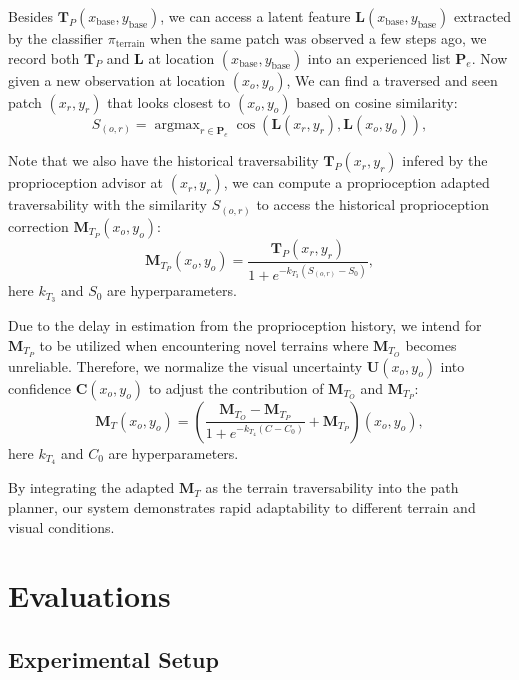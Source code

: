\documentclass[conference]{IEEEtran}
\DeclareMathOperator*{\argmax}{argmax}
\begin{document}
Besides $\bm{T}_P(x_\textrm{base},y_\textrm{base})$, we can access a latent feature $\bm{L}(x_\textrm{base}, y_\textrm{base})$ extracted by the classifier ${\pi_{\textrm{terrain}}}$ when the same patch was observed a few steps ago, we record both $\bm{T}_P$ and $\bm{L}$ at location $(x_\textrm{base},y_\textrm{base})$ into an experienced list $\bm{P}_e$. Now given a new observation at location $(x_o,y_o)$, We can find a traversed and seen patch $(x_r,y_r)$ that looks closest to $(x_o, y_o)$ based on cosine similarity:
\begin{equation}
       S_{(o,r)}=\argmax_{r \in \bm{P}_e}\cos{(\bm{L}(x_r, y_r),\bm{L}(x_o, y_o))},
\end{equation}

Note that we also have the historical traversability $\bm{T}_P(x_r,y_r)$ infered by the proprioception advisor at $(x_r, y_r)$, we can compute a proprioception adapted traversability with the similarity $S_{(o,r)}$ to access the historical proprioception correction ${\bm{M}_{T_P}}(x_o,y_o)$:
\begin{equation}
\bm{M}_{T_{P}}(x_o,y_o)=\frac{\bm{T}_P(x_r,y_r)}{1+e^{-k_{T_3}(S_{(o,r)}-S_0)}},
\end{equation}
here $k_{T_3}$ and $S_0$ are hyperparameters.

Due to the delay in estimation from the proprioception history, we intend for $\bm{M}_{T_{P}}$ to be utilized when encountering novel terrains where $\bm{M}_{T_O}$ becomes unreliable. Therefore, we normalize the visual uncertainty $\bm{U}(x_o,y_o)$ into confidence $\bm{C}(x_o,y_o)$ to adjust the contribution of $\bm{M}_{T_O}$ and $\bm{M}_{T_{P}}$:
\begin{equation}
       {\bm{M}_T}(x_o,y_o)=(\frac{\bm{M}_{T_O}-\bm{M}_{T_{P}}}{1+e^{-k_{T_4}(C-C_0)}}+\bm{M}_{T_{P}})(x_o,y_o),
\end{equation}
here $k_{T_4}$ and $C_0$ are hyperparameters.

By integrating the adapted $\bm{M}_T$ as the terrain traversability into the path planner, our system demonstrates rapid adaptability to different terrain and visual conditions.

\section{Evaluations}

\subsection{Experimental Setup}
\end{document}
